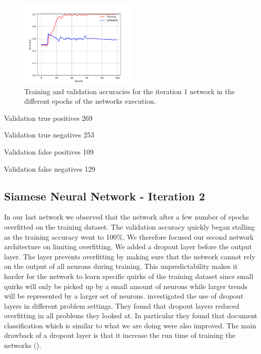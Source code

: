 \begin{figure}[htb]
    \centering
    \includegraphics[width=0.5\textwidth]{./pictures/method/network_1_accuracies.png}
    \caption{Training and validation accuracies for the iteration 1 network in
        the different epochs of the networks execution.}
    \label{fig:network1_accuracies}
\end{figure}

Validation true positives 269

Validation true negatives 253

Validation false positives 109

Validation false negatives 129


\subsection{Siamese Neural Network - Iteration 2}


In our last network we observed that the network after a few number of epochs
overfitted on the training dataset. The validation accuracy quickly began
stalling as the training accuracy went to 100\%. We therefore focused our
second network architecture on limiting overfitting. We added a dropout layer
before the output layer. The layer prevents overfitting by making sure that
the network cannot rely on the output of all neurons during training. This
unpredictability makes it harder for the network to learn specific quirks of
the training dataset since small quirks will only be picked up by a small
amount of neurons while larger trends will be represented by a larger set
of neurons. \cite{JMLR:v15:srivastava14a} investigated the use of dropout
layers in different problem settings. They found that dropout layers reduced
overfitting in all problems they looked at. In particular they found that
document classification which is similar to what we are doing were also
improved. The main drawback of a dropout layer is that it increase the run time
of training the networks (\cite{JMLR:v15:srivastava14a}).

